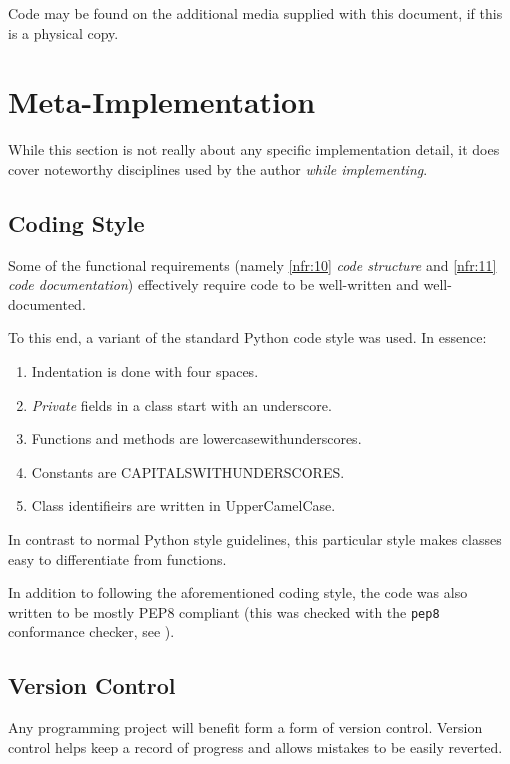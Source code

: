 \documentclass[10pt,a4paper,notitlepage]{report}
\begin{document}
Code may be found on the additional media supplied with this document, if this is a physical copy. 

\section{Meta-Implementation}
While this section is not really about any specific implementation detail, it does cover noteworthy disciplines used by the author \emph{while implementing}.

\subsection{Coding Style}
Some of the functional requirements (namely \ref{nfr:10} \emph{code structure} and \ref{nfr:11} \emph{code documentation}) effectively require code to be well-written and well-documented.

To this end, a variant of the standard Python code style was used. In essence:
\begin{enumerate}[label=\roman*)]
\item Indentation is done with four spaces.\\
\item \emph{Private} fields in a class start with an underscore.\\
\item Functions and methods are lower\textunderscore{}case\textunderscore{}with\textunderscore{}underscores.\\
\item Constants are CAPITALS\textunderscore{}WITH\textunderscore{}UNDERSCORES.\\
\item Class identifieirs are written in UpperCamelCase.
\end{enumerate}

In contrast to normal Python style guidelines, this particular style makes classes easy to differentiate from functions.

In addition to following the aforementioned coding style, the code was also written to be mostly PEP8\cite{pep8} compliant (this was checked with the \texttt{pep8} conformance checker, see \cite{pep8chk}).

\subsection{Version Control}
Any programming project will benefit form a form of version control. Version control helps keep a record of progress and allows mistakes to be easily reverted.
\end{document}
